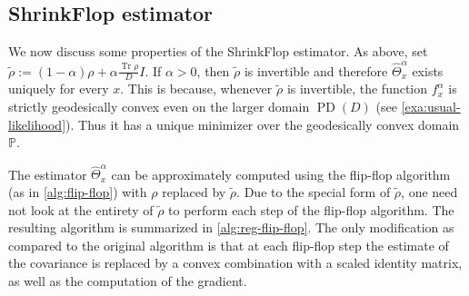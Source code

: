 \documentclass[aos]{imsart}
\theoremstyle{definition}
\numberwithin{equation}{section}
\DeclareMathOperator{\tr}{Tr}
\DeclareMathOperator{\PD}{PD}
\renewcommand{\P}{{\mathbb{P}}}
\newcommand{\samp}{x}
\newcommand{\MW}[1]{{\color{red}[MW: #1]}}
\newcommand{\MW}[1]{{}}
\begin{document}
\subsection{ShrinkFlop estimator}
We now discuss some properties of the ShrinkFlop estimator. As above, set $\tilde{\rho} := (1- \alpha) \rho + \alpha \frac{\tr \rho}{D} I.$ If $\alpha > 0$, then $\tilde{\rho}$ is invertible and therefore $\widehat{\Theta}^\alpha_x$ exists uniquely for every $x$.
This is because, whenever $\tilde{\rho}$ is invertible, the function $f_{\samp}^\alpha$ is strictly geodesically convex even on the larger domain $\PD(D)$ (see \cref{exa:usual-likelihood}). Thus it has a unique minimizer over the geodesically convex domain $\P$.

The estimator $\widehat{\Theta}^\alpha_x$ can be approximately computed using the flip-flop algorithm (as in \cref{alg:flip-flop}) with $\rho$ replaced by $\tilde{\rho}$.
Due to the special form of $\tilde{\rho}$, one need not look at the entirety of $\tilde{\rho}$ to perform each step of the flip-flop algorithm.
The resulting algorithm is summarized in \cref{alg:reg-flip-flop}.
The only modification as compared to the original algorithm is that at each flip-flop step the estimate of the covariance is replaced by a convex combination with a scaled identity matrix, as well as the computation of the gradient.

\end{document}
